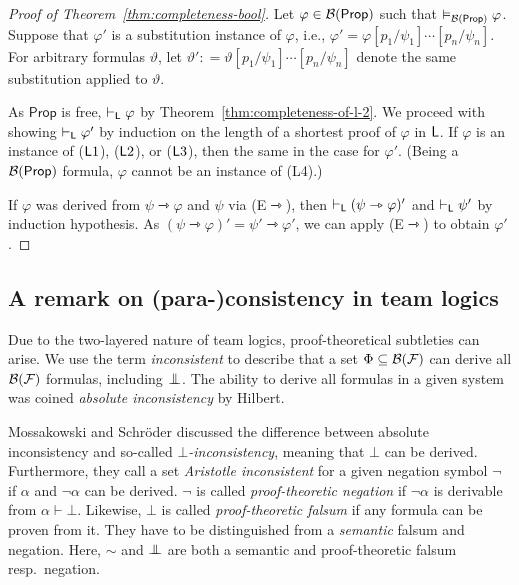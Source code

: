 \documentclass[a4paper,english,fleqn,11pt,final]{scrartcl}
\makeatletter
\newcommand{\ie}{i.e.\@\xspace}
\newcommand{\negg}{{\sim}}
\newcommand{\logic}[1]{\ensuremath{\mathsf{#1}}\xspace}
\newcommand{\PS}{\logic{Prop}}
\newcommand{\calB}{\protect\ensuremath{\mathcal{B}}}
\newcommand{\calF}{\protect\ensuremath{\mathcal{F}}}
\newcommand{\sfL}{\protect\ensuremath{\mathsf{L}}}
\providecommand{\dfn}{\mathrel{\mathop:}=}
\newcommand{\timp}{\rightarrowtriangle}
\newcommand{\Deriv}[1]{{\normalfont\textsf{#1}}}
\newcommand{\falsum}{\mathrlap{\,\bot}\bot\,}
\theoremstyle{plain}
\theoremstyle{definition}
\makeatother
\begin{document}
\begin{proof}[Proof of Theorem~\ref{thm:completeness-bool}]
Let $\varphi \in \calB(\PS)$ such that $\vDash_{\calB(\PS)} \varphi$.
Suppose that $\varphi'$ is a substitution instance of $\varphi$, \ie, $\varphi' = \varphi[p_1/\psi_1]\cdots[p_n/\psi_n]$.
For arbitrary formulas $\vartheta$, let $\vartheta' \dfn \vartheta[p_1/\psi_1]\cdots[p_n/\psi_n]$ denote the same substitution applied to $\vartheta$.

As $\PS$ is free, $\vdash_\sfL \varphi$ by Theorem~\ref{thm:completeness-of-l-2}.
We proceed with showing $\vdash_\sfL \varphi'$ by induction on the length of a shortest proof of $\varphi$ in $\sfL$.
If $\varphi$ is an instance of \Deriv{($\sfL1$)}, \Deriv{($\sfL2$)}, or \Deriv{($\sfL3$)}, then the same in the case for $\varphi'$.
(Being a $\calB(\PS)$ formula, $\varphi$ cannot be an instance of \Deriv{(L4)}.)

If $\varphi$ was derived from $\psi \timp \varphi$ and $\psi$ via \Deriv{(E$\timp$)}, then $\vdash_\sfL (\psi\timp\varphi)'$ and $\vdash_\sfL \psi'$ by induction hypothesis.
As $(\psi\timp\varphi)' = \psi' \timp\varphi'$, we can apply \Deriv{(E$\timp$)} to obtain $\varphi'$.
\end{proof}


\subsection{A remark on (para-)consistency in team logics}

Due to the two-layered nature of team logics, proof-theoretical subtleties can arise.
We use the term \emph{inconsistent} to describe that a set $\Phi \subseteq \calB(\calF)$ can derive all $\calB(\calF)$ formulas, including $\falsum$.
The ability to derive all formulas in a given system was coined \emph{absolute inconsistency} by Hilbert.

Mossakowski and Schröder \cite{mossakowski2015inconsistency} discussed the difference between absolute inconsistency and so-called \emph{$\bot$-inconsistency}, meaning that $\bot$ can be derived.
Furthermore, they call a set \emph{Aristotle inconsistent} for a given negation symbol $\neg$ if $\alpha$ and $\neg \alpha$ can be derived.
$\neg$ is called \emph{proof-theoretic negation} if $\neg\alpha$ is derivable from $\alpha \vdash \bot$.
Likewise, $\bot$ is called \emph{proof-theoretic falsum} if any formula can be proven from it.
They have to be distinguished from a \emph{semantic} falsum and negation.
Here, $\negg$ and $\falsum$ are both a semantic and proof-theoretic falsum resp.\ negation.
\end{document}
